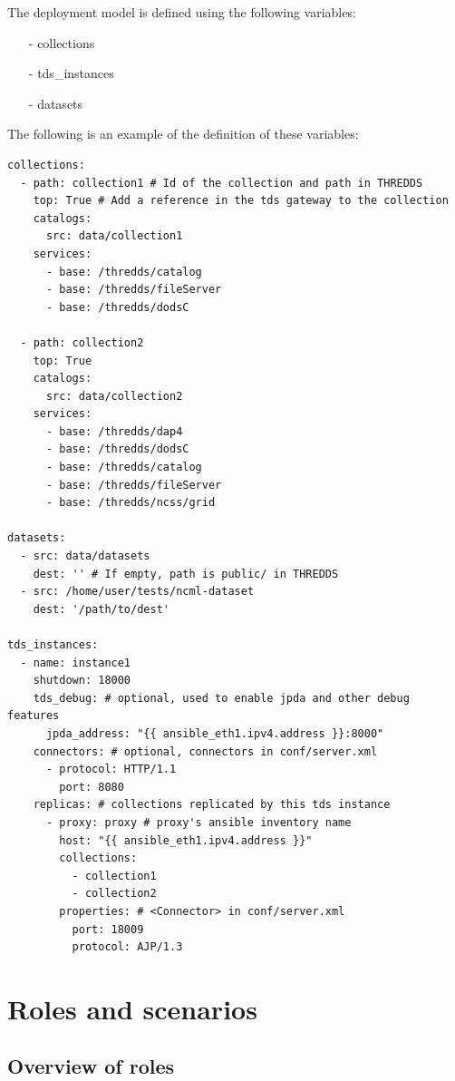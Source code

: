 \documentclass[a4paper,12pt]{article}
\begin{document}
The deployment model is defined using the following variables:

\begin{itemize}
\item[-] collections
\item[-] tds\_instances
\item[-] datasets
\end{itemize}

The following is an example of the definition of these variables:

\begin{lstlisting}
collections:
  - path: collection1 # Id of the collection and path in THREDDS
    top: True # Add a reference in the tds gateway to the collection
    catalogs:
      src: data/collection1
    services: 
      - base: /thredds/catalog
      - base: /thredds/fileServer
      - base: /thredds/dodsC

  - path: collection2
    top: True
    catalogs:
      src: data/collection2
    services:
      - base: /thredds/dap4
      - base: /thredds/dodsC
      - base: /thredds/catalog
      - base: /thredds/fileServer
      - base: /thredds/ncss/grid

datasets:
  - src: data/datasets
    dest: '' # If empty, path is public/ in THREDDS
  - src: /home/user/tests/ncml-dataset
    dest: '/path/to/dest'

tds_instances:
  - name: instance1
    shutdown: 18000
    tds_debug: # optional, used to enable jpda and other debug features
      jpda_address: "{{ ansible_eth1.ipv4.address }}:8000"
    connectors: # optional, connectors in conf/server.xml
      - protocol: HTTP/1.1
        port: 8080
    replicas: # collections replicated by this tds instance
      - proxy: proxy # proxy's ansible inventory name 
        host: "{{ ansible_eth1.ipv4.address }}" 
        collections: 
          - collection1
          - collection2
        properties: # <Connector> in conf/server.xml
          port: 18009
          protocol: AJP/1.3
\end{lstlisting}

\section{Roles and scenarios}

\subsection{Overview of roles}
\end{document}
